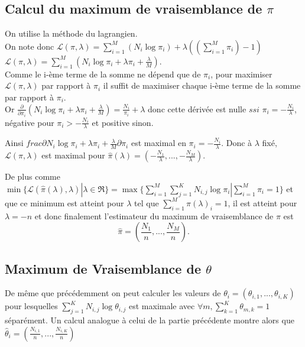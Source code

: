 \documentclass{article}
\begin{document}
\subsection{Calcul du maximum de vraisemblance de $\pi$}
On utilise la méthode du lagrangien.\\

On note donc $\mathcal{L}(\pi, \lambda) = \sum_{i=1}^{M} (N_{i} \log \pi_{i}) + \lambda((\sum_{i=1}^{M}\pi_{i})-1)$\\

 $\mathcal{L}(\pi, \lambda)=\sum_{i=1}^{M} (N_{i} \log\pi_{i}+\lambda\pi_{i}+\frac{\lambda}{M})$.\\
 Comme le i-ème terme de la somme ne dépend que de $\pi_{i}$, pour maximiser
 $\mathcal{L}(\pi, \lambda)$ par rapport à $\pi_i$ il suffit de maximiser chaque i-ème terme de la somme par rapport à $\pi_i$. \\
Or $\frac{\partial}{\partial \pi_i}( N_{i} \log\pi_{i}+\lambda\pi_{i}+\frac{\lambda}{M}) = \frac{N_{i}}{\pi_i} + \lambda$ donc cette dérivée est nulle $ssi$ $\pi_i=-\frac{N_i}{\lambda}$, négative pour $\pi_i>-\frac{N_i}{\lambda}$ et positive sinon. 

Ainsi $frac{\partial N_{i}
\log\pi_{i}+\lambda\pi_{i}+\frac{\lambda}{M}}{\partial \pi_i}$ est maximal en $\pi_i=-\frac{N_i}{\lambda}$. Donc à $\lambda$ fixé, $\mathcal{L}(\pi, \lambda)$ est maximal pour $\hat{\pi}(\lambda)=(-\frac{N_1}{\lambda}, ..., -\frac{N_M}{\lambda})$.

De plus comme $\min\{\mathcal{L}(\hat{\pi}(\lambda),
\lambda)|\lambda\in\Re\} = \max \{\sum_{i=1}^{M} \sum_{j=1}^K N_{i,j} \log\pi_i| \sum_{i=1}^{M}\pi_{i}=1 \}$ et que ce minimum est atteint pour $\lambda $ tel que $\sum_{i=1}^{M}\hat{\pi}(\lambda)_i=1$, il est atteint pour $\lambda = -n$ et donc finalement l'estimateur du maximum de vraisemblance de $\pi$ est $$\hat{\pi}=(\frac{N_1}{n}, ..., \frac{N_M}{n}).$$


\subsection{Maximum de Vraisemblance de $\theta$}
De même que précédemment on peut calculer les valeurs de $\theta_{i}=(\theta_{i,1}, ..., \theta_{i,K})$ pour lesquelles $\sum_{j=1}^K N_{i,j}\log\theta_{i,j}$ est maximale avec $\forall m,\sum_{k=1}^{K}\theta_{m,k}=1$ séparément.
Un calcul analogue à celui de la partie précédente montre alors que $\hat{\theta}_{i}=(\frac{N_{i,1}}{n}, ..., \frac{N_{i,K}}{n})$
\end{document}
